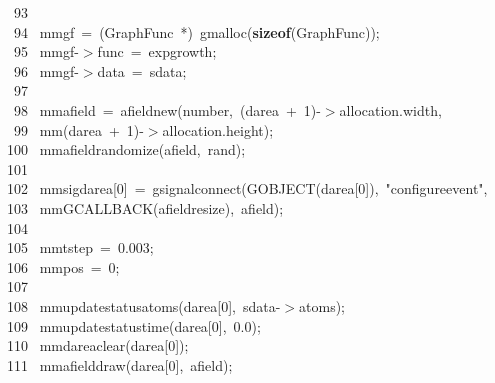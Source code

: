 \documentclass[10pt,a4paper]{article}
\newcommand{\hlstd}[1]{\textcolor[rgb]{0,0,0}{#1}}
\newcommand{\hlkey}[1]{\textcolor[rgb]{0,0,0}{\bf{#1}}}
\newcommand{\hlnum}[1]{\textcolor[rgb]{0.16,0.16,1}{#1}}
\newcommand{\hlstr}[1]{\textcolor[rgb]{1,0,0}{#1}}
\newcommand{\hlline}[1]{\textcolor[rgb]{0.33,0.33,0.33}{#1}}
\begin{document}
{}\hlline{\ \ 93\ }\hlstd{\mbox{}\\
}\hlline{\ \ 94\ }\hlstd{\hlstd{ mm}gf\ =\ (GraphFunc\ *)\ g\textunderscore malloc(}\hlkey{sizeof}\hlstd{(GraphFunc));\mbox{}\\
}\hlline{\ \ 95\ }\hlstd{\hlstd{ mm}gf-$>$func\ =\ exp\textunderscore growth;\mbox{}\\
}\hlline{\ \ 96\ }\hlstd{\hlstd{ mm}gf-$>$data\ =\ sdata;\mbox{}\\
}\hlline{\ \ 97\ }\hlstd{\mbox{}\\
}\hlline{\ \ 98\ }\hlstd{\hlstd{ mm}afield\ =\ afield\textunderscore new(number,\ (darea\ +\ }\hlnum{1}\hlstd{)-$>$allocation.width,\mbox{}\\
}\hlline{\ \ 99\ }\hlstd{\hlstd{ mm}(darea\ +\ }\hlnum{1}\hlstd{)-$>$allocation.height);\mbox{}\\
}\hlline{\ 100\ }\hlstd{\hlstd{ mm}afield\textunderscore randomize(afield,\ rand);\mbox{}\\
}\hlline{\ 101\ }\hlstd{\mbox{}\\
}\hlline{\ 102\ }\hlstd{\hlstd{ mm}sig\textunderscore darea[}\hlnum{0}\hlstd{]\ =\ g\textunderscore signal\textunderscore connect(G\textunderscore OBJECT(darea[}\hlnum{0}\hlstd{]),\ }\hlstr{"configure\textunderscore event"}\hlstd{,\mbox{}\\
}\hlline{\ 103\ }\hlstd{\hlstd{ mm}G\textunderscore CALLBACK(afield\textunderscore resize),\ afield);\mbox{}\\
}\hlline{\ 104\ }\hlstd{\mbox{}\\
}\hlline{\ 105\ }\hlstd{\hlstd{ mm}tstep\ =\ }\hlnum{0.003}\hlstd{;\mbox{}\\
}\hlline{\ 106\ }\hlstd{\hlstd{ mm}pos\ =\ }\hlnum{0}\hlstd{;\mbox{}\\
}\hlline{\ 107\ }\hlstd{\mbox{}\\
}\hlline{\ 108\ }\hlstd{\hlstd{ mm}update\textunderscore status\textunderscore atoms(darea[}\hlnum{0}\hlstd{],\ sdata-$>$atoms);\mbox{}\\
}\hlline{\ 109\ }\hlstd{\hlstd{ mm}update\textunderscore status\textunderscore time(darea[}\hlnum{0}\hlstd{],\ }\hlnum{0.0}\hlstd{);\mbox{}\\
}\hlline{\ 110\ }\hlstd{\hlstd{ mm}darea\textunderscore clear(darea[}\hlnum{0}\hlstd{]);\mbox{}\\
}\hlline{\ 111\ }\hlstd{\hlstd{ mm}afield\textunderscore draw(darea[}\hlnum{0}\hlstd{],\ afield);\mbox{}\\
}
\end{document}
